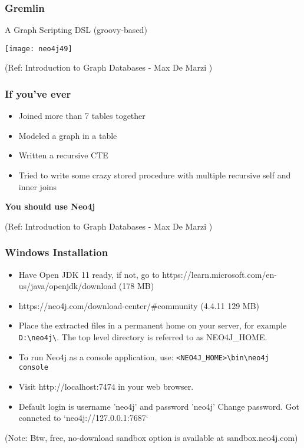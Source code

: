 \begin{frame}\frametitle{Gremlin}

A Graph Scripting DSL (groovy-based)

\begin{center}
\texttt{[image: neo4j49]}
\end{center}	

{\tiny (Ref: Introduction to Graph Databases - Max De Marzi )}
\end{frame}

\begin{frame}\frametitle{If you’ve ever}

\begin{itemize}
\item Joined more than 7 tables together
\item  Modeled a graph in a table
\item  Written a recursive CTE
\item Tried to write some crazy stored procedure with multiple recursive self and inner joins
\end{itemize}

{\bf You should use Neo4j}

{\tiny (Ref: Introduction to Graph Databases - Max De Marzi )}
\end{frame}


\begin{frame}[fragile]\frametitle{Windows Installation}

\begin{itemize}
\item Have Open JDK 11 ready, if not, go to https://learn.microsoft.com/en-us/java/openjdk/download (178 MB)
\item https://neo4j.com/download-center/\#community (4.4.11 129 MB)
\item Place the extracted files in a permanent home on your server, for example \lstinline|D:\neo4j\|. The top level directory is referred to as NEO4J\_HOME.
\item To run Neo4j as a console application, use: \lstinline|<NEO4J_HOME>\bin\neo4j console|


\item Visit http://localhost:7474 in your web browser.
\item Default login is username 'neo4j' and password 'neo4j' Change password. Got conncted to `neo4j://127.0.0.1:7687`
\end{itemize}

(Note: Btw, free, no-download sandbox option is available at sandbox.neo4j.com)
\end{frame}

